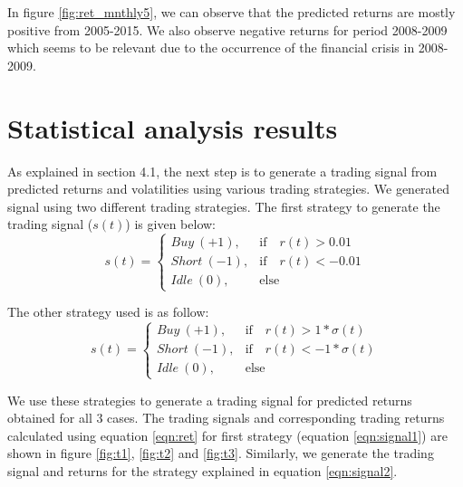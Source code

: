 In figure \ref{fig:ret_mnthly5}, we can observe that the predicted returns are mostly positive from 2005-2015. We also observe negative returns for period 2008-2009 which seems to be relevant due to the occurrence of the financial crisis in 2008-2009.


\section{Statistical analysis results}
As explained in section 4.1, the next step is to generate a trading signal from predicted returns and volatilities using various trading strategies. We generated signal using two different trading strategies. The first strategy to generate the trading signal ($s(t)$) is given below:
\begin{equation} \label{eqn:signal1}
s(t) = 
\begin{cases}
  Buy\ (+1), & \text{if} \quad r(t) > 0.01 \\
  Short\ (-1), & \text{if} \quad r(t) < -0.01 \\
  Idle\ (0),  & \text{else}
\end{cases}
\end{equation}

The other strategy used is as follow:
\begin{equation} \label{eqn:signal2}
s(t) = 
\begin{cases}
  Buy\ (+1), & \text{if} \quad r(t) > 1*\sigma(t) \\
  Short\ (-1), & \text{if} \quad r(t) < -1*\sigma(t) \\
  Idle\ (0),  & \text{else}
\end{cases}
\end{equation}


We use these strategies to generate a trading signal for predicted returns obtained for all 3 cases. The trading signals and corresponding trading returns calculated using equation \ref{eqn:ret} for first strategy (equation \ref{eqn:signal1}) are shown in figure \ref{fig:t1}, \ref{fig:t2} and \ref{fig:t3}.
Similarly, we generate the trading signal and returns for the strategy explained in equation \ref{eqn:signal2}.

